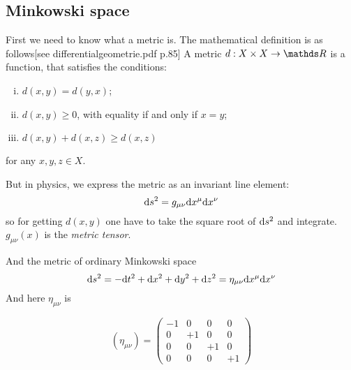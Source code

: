 \subsection{Minkowski space \checkmark}
	First we need to know what a metric is. 
	The mathematical definition is as follows[see differentialgeometrie.pdf p.85]
	A metric
	$ d:X\times X \rightarrow \R$ is a function, that satisfies the conditions:
		\begin{enumerate}[(i)]
			\item $d(x,y)=d(y,x)$;
			\item $d(x,y)\geq 0$, with equality if and only if $x=y$;
			\item $d(x,y)+d(x,z)\geq d(x,z)$
		\end{enumerate}
	for any $x,y,z \in X$.
	 
	But in physics, we express the metric as an invariant line element:
		\begin{equation}
		 	\mathrm{d} s^2 = g_{\mu\nu} \mathrm{d} x^\mu \mathrm{d} x^\nu
		\end{equation}
	so for getting $d(x,y)$ one have to take the square root of $\mathrm{d} s^2$ and integrate. $g_{\mu\nu}(x)$ is the \textit{metric tensor}.
	 
	 And the metric of ordinary Minkowski space 
		\begin{equation}
			\mathrm{d} s^2=- \mathrm{d} t^2 + \mathrm{d} x^2 + \mathrm{d} y^2 + \mathrm{d} z^2 = \eta_{\mu\nu} \mathrm{d} x^\mu \mathrm{d} x^\nu
		\end{equation}
	And here $\eta_{\mu\nu}$ is

		\begin{equation}
		    \left(\eta_{\mu\nu}\right)=
		    \left(\begin{array}{cccc}
		    	-1 & 0 & 0 & 0\\
		    	0 & +1 & 0 & 0\\
		    	0 & 0 & +1 & 0\\
		    	0 & 0 & 0 & +1
			\end{array}\right)
		\end{equation}
	 
